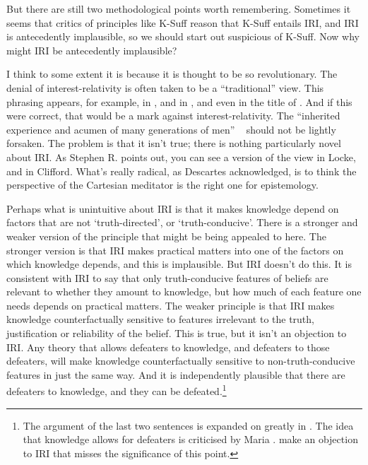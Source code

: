 But there are still two methodological points worth remembering. Sometimes it seems that critics of principles like K-Suff reason that K-Suff entails IRI, and IRI is antecedently implausible, so we should start out suspicious of K-Suff. Now why might IRI be antecedently implausible? 

I think to some extent it is because it is thought to be so revolutionary. The denial of interest-relativity is often taken to be a ``traditional'' view. This phrasing appears, for example, in  \citet{Boyd2015}, and in  \citet{IchikawaEtAl2012}, and even in the title of  \citet{Buckwalter2014}. And if this were correct, that would be a mark against interest-relativity. The ``inherited experience and acumen of many generations of men'' ~\citep[11]{Austin1956} should not be lightly forsaken. The problem is that it isn't true; there is nothing particularly novel about IRI. As Stephen R.  \citet{Grimm2015} points out, you can see a version of the view in Locke, and in Clifford. What's really radical, as Descartes acknowledged, is to think the perspective of the Cartesian meditator is the right one for epistemology.

Perhaps what is unintuitive about IRI is that it makes knowledge depend on factors that are not `truth-directed', or `truth-conducive'. There is a stronger and weaker version of the principle that might be being appealed to here. The stronger version is that IRI makes practical matters into one of the factors on which knowledge depends, and this is implausible. But IRI doesn't do this. It is consistent with IRI to say that only truth-conducive features of beliefs are relevant to whether they amount to knowledge, but how much of each feature one needs depends on practical matters. The weaker principle is that IRI makes knowledge counterfactually sensitive to features irrelevant to the truth, justification or reliability of the belief. This is true, but it isn't an objection to IRI. Any theory that allows defeaters to knowledge, and defeaters to those defeaters, will make knowledge counterfactually sensitive to non-truth-conducive features in just the same way. And it is independently plausible that there are defeaters to knowledge, and they can be defeated.\footnote{The argument of the last two sentences is expanded on greatly in  \citet[§3]{Weatherson2014-ProbScept}. The idea that knowledge allows for defeaters is criticised by Maria  \citet{Lasonen-Aarnio2014a}.  \citet{EatonPickvance2015} make an objection to IRI that misses the significance of this point.}

